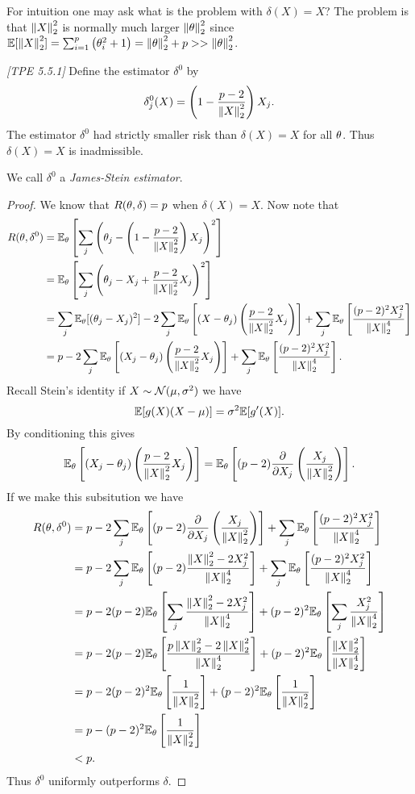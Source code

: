 For intuition one may ask what is the problem with $\delta(X)=X$? The problem is that $\left\|X\right\|_2^2$ is normally much larger $\left\|{\theta}\right\|_2^2$ since ${\mathbb{E}}[\left\|X\right\|_2^2] =\sum_{i=1}^p \left({\theta}_i^2+1\right) = \left\|{\theta}\right\|_2^2+p >> \left\|{\theta}\right\|_2^2$.
\begin{thrm}
    \emph{[TPE 5.5.1]} Define the estimator $\delta^0$ by
    \[\delta_j^0(X) = \left(1-\frac{p-2}{\left\|X\right\|_2^2}\right)X_j. \]
    The estimator $\delta^0$ had strictly smaller risk than $\delta(X)=X$ for all ${\theta}$. Thus $\delta(X)=X$ is inadmissible.
\end{thrm}
We call $\delta^0$ a \emph{James-Stein estimator}.
\begin{proof}
    We know that $R({\theta},\delta) = p$ when $\delta(X)=X$. Now note that
    \begin{align*}
        R({\theta},\delta^0) &= {\mathbb{E}}_{\theta}\left[\sum_j \left({\theta}_j - \left(1- \frac{p-2}{\left\|X\right\|_2^2}\right)X_j\right)^2\right]\\
        &= {\mathbb{E}}_{\theta}\left[\sum_j \left({\theta}_j - X_j+ \frac{p-2}{\left\|X\right\|_2^2}X_j\right)^2\right]\\
        &=\sum_j {\mathbb{E}}_{\theta}[({\theta}_j-X_j)^2]-2\sum_j {\mathbb{E}}_{\theta}\left[(X-{\theta}_j)\left(\frac{p-2}{\left\|X\right\|_2^2}X_j\right)\right]+\sum_j {\mathbb{E}}_{\theta}\left[\frac{(p-2)^2X_j^2}{\left\|X\right\|_2^4}\right]\\
        &=p-2\sum_j {\mathbb{E}}_{\theta}\left[(X_j-{\theta}_j)\left(\frac{p-2}{\left\|X\right\|_2^2}X_j\right)\right]+\sum_j {\mathbb{E}}_{\theta}\left[\frac{(p-2)^2X_j^2}{\left\|X\right\|_2^4}\right].
    \end{align*}
    Recall Stein's identity if $X\sim {{\mathcal{N}}}(\mu,\sigma^2)$ we have
    \[{\mathbb{E}}[g(X)(X-\mu)] = \sigma^2{\mathbb{E}}[g'(X)]. \]
    By conditioning this gives 
    \[ {\mathbb{E}}_{\theta}\left[(X_j-{\theta}_j)\left(\frac{p-2}{\left\|X\right\|_2^2}X_j\right)\right] = {\mathbb{E}}_{\theta}\left[(p-2)\frac{\partial}{\partial X_j}\left(\frac{X_j}{\left\|X\right\|_2^2}\right)\right].\]
    If we make this subsitution we have
    \begin{align*}
        R({\theta},\delta^0) &=p-2\sum_j {\mathbb{E}}_{\theta}\left[(p-2)\frac{\partial}{\partial X_j}\left(\frac{X_j}{\left\|X\right\|_2^2}\right)\right]+\sum_j {\mathbb{E}}_{\theta}\left[\frac{(p-2)^2X_j^2}{\left\|X\right\|_2^4}\right]\\
        &=p-2\sum_j {\mathbb{E}}_{\theta}\left[(p-2)\frac{\left\|X\right\|_2^2-2X_j^2}{\left\|X\right\|_2^4}\right]+\sum_j {\mathbb{E}}_{\theta}\left[\frac{(p-2)^2X_j^2}{\left\|X\right\|_2^4}\right]\\
        &=p-2(p-2){\mathbb{E}}_{\theta}\left[\sum_j \frac{\left\|X\right\|_2^2-2X_j^2}{\left\|X\right\|_2^4}\right]+(p-2)^2{\mathbb{E}}_{\theta}\left[\sum_j \frac{X_j^2}{\left\|X\right\|_2^4}\right]\\
        &=p-2(p-2){\mathbb{E}}_{\theta}\left[\frac{p\left\|X\right\|_2^2-2\left\|X\right\|_2^2}{\left\|X\right\|_2^4}\right]+(p-2)^2{\mathbb{E}}_{\theta}\left[\frac{\left\|X\right\|^2_2}{\left\|X\right\|_2^4}\right]\\
        &=p-2(p-2)^2{\mathbb{E}}_{\theta}\left[\frac{1}{\left\|X\right\|_2^2}\right]+(p-2)^2{\mathbb{E}}_{\theta}\left[\frac{1}{\left\|X\right\|_2^2}\right]\\
        &=p-(p-2)^2{\mathbb{E}}_{\theta}\left[\frac{1}{\left\|X\right\|_2^2}\right]\\
        &<p.
    \end{align*}
    Thus $\delta^0$ uniformly outperforms $\delta$.
\end{proof}

